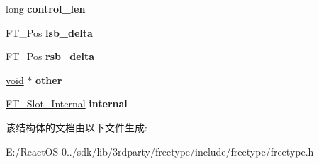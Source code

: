 \begin{DoxyCompactItemize}
long {\bfseries control\+\_\+len}
\item 
\mbox{\label{struct_f_t___glyph_slot_rec___a7d0d8c2eda28e38541e953186ecab89a}} 
F\+T\+\_\+\+Pos {\bfseries lsb\+\_\+delta}
\item 
\mbox{\label{struct_f_t___glyph_slot_rec___a2ca5f5e7b92df3aee4584949fa6a2a1c}} 
F\+T\+\_\+\+Pos {\bfseries rsb\+\_\+delta}
\item 
\mbox{\label{struct_f_t___glyph_slot_rec___ad0c5ab51842f178ba571bab2874f1bdb}} 
\hyperlink{interfacevoid}{void} $\ast$ {\bfseries other}
\item 
\mbox{\label{struct_f_t___glyph_slot_rec___a91731fd527eeab1d1acf3e1aea4bea84}} 
\hyperlink{struct_f_t___slot___internal_rec__}{F\+T\+\_\+\+Slot\+\_\+\+Internal} {\bfseries internal}
\end{DoxyCompactItemize}


该结构体的文档由以下文件生成\+:\begin{DoxyCompactItemize}
\item 
E\+:/\+React\+O\+S-\/0../sdk/lib/3rdparty/freetype/include/freetype/freetype.\+h\end{DoxyCompactItemize}
